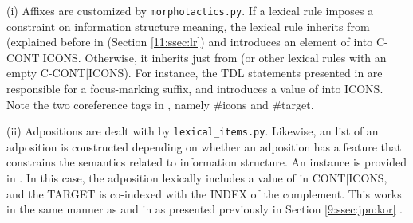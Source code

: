 (i) Affixes are customized by \texttt{morphotactics.py}.  If a lexical
rule imposes a constraint on information structure meaning, the
lexical rule inherits from  (explained before
in (Section \ref{11:ssec:lr}) and introduces an element of  into
C-CONT{$\mid$}ICONS. Otherwise, it inherits just
from  (or other lexical rules with an
empty C-CONT{$\mid$}ICONS). For instance, the TDL statements
presented in  are responsible for a focus-marking
suffix, and introduces a value of  into ICONS. Note the
two coreference tags in , namely \#icons and
\#target.




(ii) Adpositions are dealt with by
\texttt{lexical\_items.py}. Likewise, an  list of an adposition
is constructed depending on whether an adposition has a feature that
constrains the semantics related to information structure. An instance
is provided in . In this case, the adposition lexically
includes a value of  in CONT{$\mid$}ICONS, and the
TARGET is co-indexed with the INDEX of the complement. This works in
the same manner as \ga and \wa in  as presented
previously in Section \ref{9:ssec:jpn:kor} .






